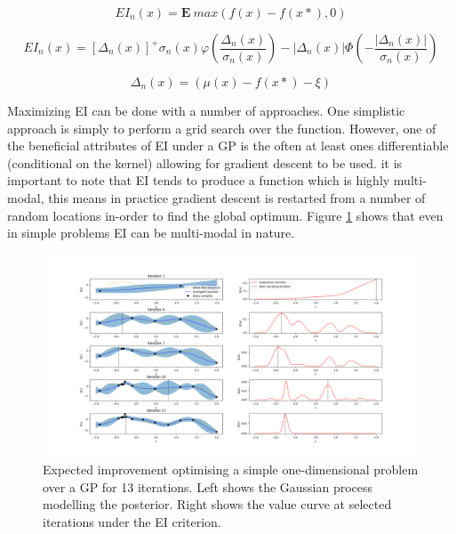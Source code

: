 \documentclass{article}
\begin{document}
			 

			\begin{equation}\label{eq:ei1} EI_n(x) = \mathbf{E} ~max(f(x) -f(x*),0)\end{equation}

			\begin{equation}\label{eq:ei2} EI_n(x) = [\Delta_n(x)]^+ \sigma_n(x)\varphi\left(\frac{\Delta_n(x)}{\sigma_n(x)}\right)  - |\Delta_n(x)| \Phi\left(-\frac{|\Delta_n(x)|}{\sigma_n(x)}\right)\end{equation}

			\begin{equation}\label{eq:ei3}\Delta_n(x) = (\mu(x) - f(x*) - \xi) \end{equation}


			Maximizing EI can be done with a number of approaches. One simplistic approach is simply to perform a grid search over the function. However, one of the beneficial attributes of EI under a GP is the often at least ones differentiable (conditional on the kernel) allowing for gradient descent to be used. it is important to note that EI tends to produce a function which is highly multi-modal, this means in practice gradient descent is restarted from a number of random locations in-order to find the global optimum. Figure \ref{fig:EI1} shows that even in simple problems EI can be multi-modal in nature.
				

			\begin{figure}[h]

			\includegraphics[trim=20 0 0 0 ,scale=0.25]{EIsimp.png}

			\caption{
			Expected improvement optimising a simple one-dimensional problem over a GP for 13 iterations. Left shows the Gaussian process modelling the posterior. Right shows the value curve at selected iterations under the EI criterion.
			}
			\label{fig:EI1}

			\end{figure}
\end{document}
